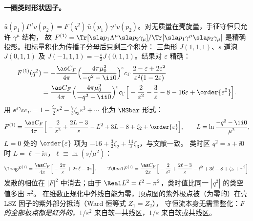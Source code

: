 \paragraph{一圈类时形状因子。}
$\bar u(p_1)\Gamma^\mu v(p_2)=F(q^2)\,\bar u(p_1)\gamma^\mu v(p_2)$。对无质量在壳旋量，手征守恒只允许 $\gamma^\mu$ 结构，
故 $F^{(1)}=\Tr[\sla p_1\Lambda^\mu\sla p_2\gamma_\mu]/\Tr[\sla p_1\gamma^\mu\sla p_2\gamma_\mu]$ 是精确投影。把标量积化为传播子分母后只剩三个积分：
三角形 $J(1,1,1)$、$s$ 道泡 $J(0,1,1)$ 及 $J(-1,1,1)=-\frac s2J(0,1,1)$。结果对 $\varepsilon$ 精确：
\begin{equation}\label{eq:ee-F1}
\begin{split}
F^{(1)}(q^2)&=-\frac{\as C_F}{4\pi}\Big(\frac{4\pi\mu_0^2}{-q^2-\ii0}\Big)^{\varepsilon}c_\Gamma\,
\frac{2-\varepsilon+2\varepsilon^2}{\varepsilon^2(1-2\varepsilon)}\\
&=\frac{\as C_F}{4\pi}\Big(\frac{4\pi\mu_0^2}{-q^2-\ii0}\Big)^{\varepsilon}c_\Gamma
\Big[-\frac{2}{\varepsilon^2}-\frac{3}{\varepsilon}-8-16\varepsilon+\order{\varepsilon^2}\Big].
\end{split}
\end{equation}
用 $\ee^{\varepsilon\gamma_E}c_\Gamma=1-\frac{\zeta_2}{2}\varepsilon^2-\frac73\zeta_3\varepsilon^3+\cdots$ 化为 $\MSbar$ 形式：
\begin{equation}\label{eq:ee-F1MS}
F^{(1)}=\frac{\as C_F}{4\pi}\Big[-\frac{2}{\varepsilon^2}+\frac{2L-3}{\varepsilon}-L^2+3L-8+\zeta_2+\order{\varepsilon}\Big],
\qquad L=\ln\frac{-q^2-\ii0}{\mu^2},
\end{equation}
$L=0$ 处的 $\order{\varepsilon}$ 项为 $-16+\frac32\zeta_2+\frac{14}{3}\zeta_3$，与文献\cite{Gonsalves1983,MochVermaserenVogt2005}一致。
类时区 $q^2=s+\ii0$ 时 $L=\ell-\ii\pi$，$\ell\equiv\ln(s/\mu^2)$：
\begin{equation}\label{eq:ee-ImF}
\Imag F^{(1)}=\frac{\as C_F}{4\pi}\Big[-\frac{2\pi}{\varepsilon}+2\pi\ell-3\pi\Big],\qquad
2\Real F^{(1)}=\frac{\as C_F}{2\pi}\Big[-\frac{2}{\varepsilon^2}+\frac{2\ell-3}{\varepsilon}-\ell^2+3\ell-8+\zeta_2+\pi^2\Big].
\end{equation}
发散的相位在 $|F|^2$ 中消去；由于 $\Real L^2=\ell^2-\pi^2$，类时值比同一 $|q^2|$ 的类空值多出 $\pi^2$。
在维数正规化中外线自能为零，顶点图的紫外极点被（为零的）在壳 LSZ 因子的紫外部分抵消（Ward 恒等式 $Z_1=Z_2$），
守恒流本身无需重整化：\emph{$F$ 的全部极点都是红外的}，$1/\varepsilon^2$ 来自软—共线区，$1/\varepsilon$ 来自软或共线区。

